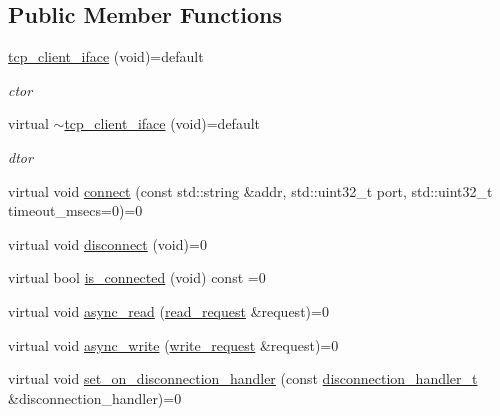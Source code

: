 \subsection*{Public Member Functions}
\begin{DoxyCompactItemize}
\item 
\mbox{\label{classcpp__redis_1_1network_1_1tcp__client__iface_a8504873049519bcebd626984e4087a90}} 
\hyperlink{classcpp__redis_1_1network_1_1tcp__client__iface_a8504873049519bcebd626984e4087a90}{tcp\+\_\+client\+\_\+iface} (void)=default
\begin{DoxyCompactList}\small\item\em ctor \end{DoxyCompactList}\item 
\mbox{\label{classcpp__redis_1_1network_1_1tcp__client__iface_a7381e8921118a13b5994101864906122}} 
virtual \hyperlink{classcpp__redis_1_1network_1_1tcp__client__iface_a7381e8921118a13b5994101864906122}{$\sim$tcp\+\_\+client\+\_\+iface} (void)=default
\begin{DoxyCompactList}\small\item\em dtor \end{DoxyCompactList}\item 
virtual void \hyperlink{classcpp__redis_1_1network_1_1tcp__client__iface_a81ee982136e85b7c3401393341bc594c}{connect} (const std\+::string \&addr, std\+::uint32\+\_\+t port, std\+::uint32\+\_\+t timeout\+\_\+msecs=0)=0
\item 
virtual void \hyperlink{classcpp__redis_1_1network_1_1tcp__client__iface_a137e7af3aa25e7ac1b57915de182b379}{disconnect} (void)=0
\item 
virtual bool \hyperlink{classcpp__redis_1_1network_1_1tcp__client__iface_a41ad0b43e3ab172828a3d2ce55d23893}{is\+\_\+connected} (void) const =0
\item 
virtual void \hyperlink{classcpp__redis_1_1network_1_1tcp__client__iface_ae1f9fa87002273a0caf340407bb68ade}{async\+\_\+read} (\hyperlink{structcpp__redis_1_1network_1_1tcp__client__iface_1_1read__request}{read\+\_\+request} \&request)=0
\item 
virtual void \hyperlink{classcpp__redis_1_1network_1_1tcp__client__iface_a9cd01e8a68479456d15d6435ffad9b92}{async\+\_\+write} (\hyperlink{structcpp__redis_1_1network_1_1tcp__client__iface_1_1write__request}{write\+\_\+request} \&request)=0
\item 
virtual void \hyperlink{classcpp__redis_1_1network_1_1tcp__client__iface_acecf3b75c3849071d82478bc7a8c97a8}{set\+\_\+on\+\_\+disconnection\+\_\+handler} (const \hyperlink{classcpp__redis_1_1network_1_1tcp__client__iface_a9a7d5942205db8be03da581a848b8ec0}{disconnection\+\_\+handler\+\_\+t} \&disconnection\+\_\+handler)=0
\end{DoxyCompactItemize}


